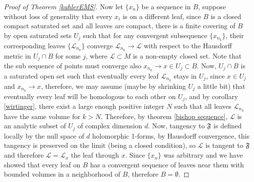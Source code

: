 \documentclass[12pt,twoside,a4paper]{report}
\newcommand{\nat}{\ensuremath{ \mathbb N }}
\begin{document}
\begin{proof}[Proof of Theorem \ref{kahlerEMS}]
  Now let $\{x_n\}$ be a sequence in $B$, suppose without loss of generality that every \(x_i\) is on a different leaf, since $B$ is a closed compact saturated set and all leaves are compact, there is a finite covering of $B$ by open saturated sets $U_j$ such that for any convergent subsequence $\{x_{n_k}\}$, their corresponding leaves $\{\mathcal{L}_{n_k}\}$ converge $\mathcal{L}_{n_{k}}\to\mathcal{L}$ with respect to the Hausdorff metric in $U_j\cap B$ for some $j$, where $\mathcal{L}\subset M$ is a non-empty closed set. Note that the sub sequence of points must converge also \(x_{n_k}\to{x}\in U_j\subset B\).
  Now, $U_j\cap B$ is a saturated open set such that eventually every leaf $\mathcal{L}_{n_k}$ stays in $U_j$, since $x\in U_j$ and $x_{n_k}\to{x}$, therefore, we may assume (maybe by shrinking $U_j$ a little bit) that eventually every leaf will be homologous to each other on $U_j$, and by corollary \ref{wirtinger}, there exist a large enough positive integer $N$ such that all leaves $\mathcal{L}_{n_k}$ have the same volume for $k>N$. Therefore, by theorem \ref{bishop sequence}, $\mathcal{L}$ is an analytic subset of $U_j$ of complex dimension $d$.
  Now, tangency to $\mathfrak{F}$ is defined locally by the null space of $d$ holomorphic 1-forms, by Hausdorff convergence, this tangency is preserved on the limit (being a closed condition), so $\mathcal{L}$ is tangent to $\mathfrak{F}$ and therefore $\mathcal{L}=\mathcal{L}_x$ the leaf through $x$.
  Since $\{x_{n}\}$ was arbitrary and we have showed that every leaf on $B$ has a convergent sequence of leaves near them with bounded volumes in a neighborhood of $B$, therefore $B=\emptyset$.



\end{proof}
\end{document}
